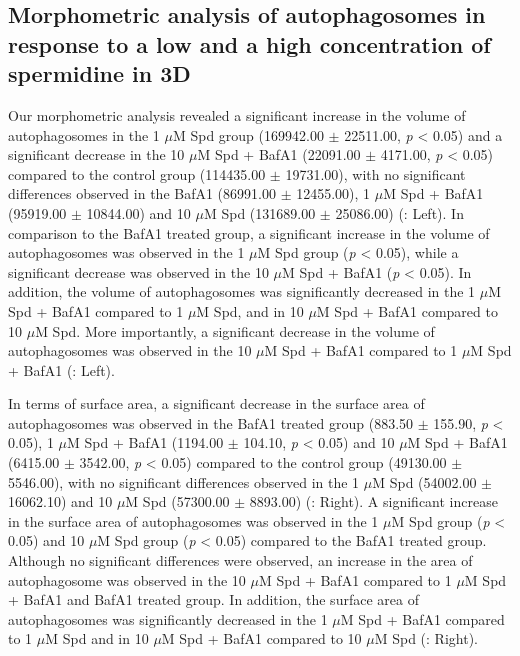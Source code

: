 \subsection{Morphometric analysis of autophagosomes  in response to a low and a high concentration of spermidine in 3D}
Our morphometric analysis revealed a significant increase in the volume of autophagosomes in the 1 $\mu$M Spd group (169942.00 $\pm$ 22511.00, \textit{p} < 0.05) and a significant decrease in the 10 $\mu$M Spd + BafA1 (22091.00 $\pm$ 4171.00, \textit{p} < 0.05) compared to the control group (114435.00 $\pm$ 19731.00), with no significant differences observed in the BafA1 (86991.00 $\pm$ 12455.00), 1 $\mu$M Spd + BafA1 (95919.00 $\pm$ 10844.00) and 10 $\mu$M Spd (131689.00 $\pm$ 25086.00) (: Left). In comparison to the BafA1 treated group, a significant increase in the volume of autophagosomes was observed in the 1 $\mu$M Spd group (\textit{p} < 0.05), while a significant decrease was observed in the 10 $\mu$M Spd + BafA1 (\textit{p} < 0.05). In addition, the volume of autophagosomes was significantly decreased in the 1 $\mu$M Spd + BafA1 compared to 1 $\mu$M Spd, and in 10 $\mu$M Spd + BafA1 compared to 10 $\mu$M Spd. More importantly, a significant decrease in the volume of autophagosomes was observed in the 10 $\mu$M Spd + BafA1 compared to 1 $\mu$M Spd + BafA1 (: Left). 

In terms of surface area, a significant decrease in the surface area of autophagosomes was observed in the BafA1 treated group (883.50 $\pm$ 155.90, \textit{p} < 0.05), 1 $\mu$M Spd + BafA1 (1194.00 $\pm$ 104.10, \textit{p} < 0.05) and 10 $\mu$M Spd + BafA1 (6415.00 $\pm$ 3542.00, \textit{p} < 0.05) compared to the control group (49130.00 $\pm$ 5546.00), with no significant differences observed in the 1 $\mu$M Spd (54002.00 $\pm$ 16062.10) and 10 $\mu$M Spd (57300.00 $\pm$ 8893.00) (: Right). A significant increase in the surface area of autophagosomes was observed in the 1 $\mu$M Spd group (\textit{p} < 0.05) and 10 $\mu$M Spd group (\textit{p} < 0.05) compared to the BafA1 treated group. Although no significant differences were observed, an increase in the area of autophagosome was observed in the 10 $\mu$M Spd + BafA1 compared to 1 $\mu$M Spd + BafA1 and BafA1 treated group. In addition, the surface area of autophagosomes was significantly decreased in the 1 $\mu$M Spd + BafA1 compared to 1 $\mu$M Spd and in 10 $\mu$M Spd + BafA1 compared to 10 $\mu$M Spd (: Right). 

